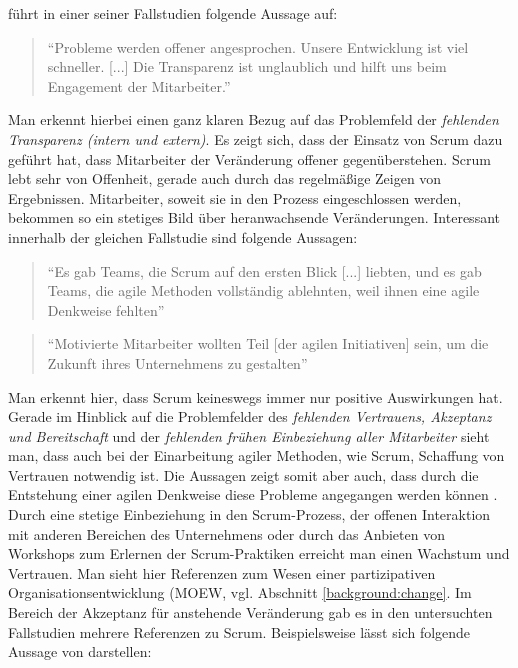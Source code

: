  führt in einer seiner Fallstudien folgende Aussage auf:

\begin{quote}
	``Probleme werden offener angesprochen. Unsere Entwicklung ist viel schneller. [...] Die Transparenz ist unglaublich und hilft uns beim Engagement der Mitarbeiter.'' \cite[S. 5]{fuchs_adapting_2019}
\end{quote}

Man erkennt hierbei einen ganz klaren Bezug auf das Problemfeld der \textit{fehlenden Transparenz (intern und extern)}. Es zeigt sich, dass der Einsatz von Scrum dazu geführt hat, dass Mitarbeiter der Veränderung offener gegenüberstehen. Scrum lebt sehr von Offenheit, gerade auch durch das regelmäßige Zeigen von Ergebnissen. Mitarbeiter, soweit sie in den Prozess eingeschlossen werden, bekommen so ein stetiges Bild über heranwachsende Veränderungen. Interessant innerhalb der gleichen Fallstudie sind folgende Aussagen:


\begin{quote}
	``Es gab Teams, die Scrum auf den ersten Blick [...] liebten, und es gab Teams, die agile Methoden vollständig ablehnten, weil ihnen eine agile Denkweise fehlten'' \cite[S. 5]{fuchs_adapting_2019}
\end{quote}

\begin{quote}
	 ``Motivierte Mitarbeiter wollten Teil [der agilen Initiativen] sein, um die Zukunft ihres Unternehmens zu gestalten'' \cite[S. 7]{fuchs_adapting_2019}
\end{quote}


Man erkennt hier, dass Scrum keineswegs immer nur positive Auswirkungen hat. Gerade im Hinblick auf die Problemfelder des \textit{fehlenden Vertrauens, Akzeptanz und Bereitschaft} und der \textit{fehlenden frühen Einbeziehung aller Mitarbeiter} sieht man, dass auch bei der  Einarbeitung agiler Methoden, wie Scrum, Schaffung von Vertrauen notwendig ist. Die Aussagen zeigt somit aber auch, dass durch die Entstehung einer agilen Denkweise diese Probleme angegangen werden können \cite{hofert_agile_2018}. Durch eine stetige Einbeziehung in den Scrum-Prozess, der offenen Interaktion mit anderen Bereichen des Unternehmens oder durch das Anbieten von Workshops zum Erlernen der Scrum-Praktiken erreicht man einen Wachstum und Vertrauen. Man sieht hier Referenzen zum Wesen einer partizipativen Organisationsentwicklung (MOEW, vgl. Abschnitt \ref{background:change}. Im Bereich der Akzeptanz für anstehende Veränderung gab es in den untersuchten Fallstudien mehrere Referenzen zu Scrum. Beispielsweise lässt sich folgende Aussage von  darstellen:

